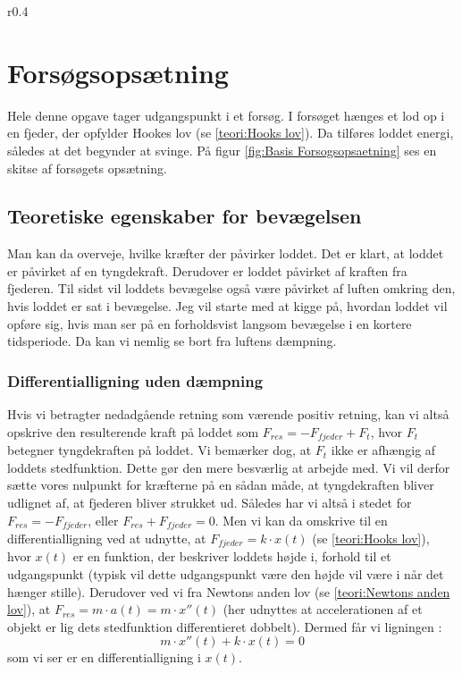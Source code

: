 \begin{wrapfigure}{r}{0.4\textwidth}
\centering
{}%

\caption{Skitse af forsøgsopsætning.}
\label{fig:Basis Forsogsopsaetning}
\end{wrapfigure} 


\section{Forsøgsopsætning}\label{teori: opsatning af differentialligninger}
Hele denne opgave tager udgangspunkt i et forsøg.
I forsøget hænges et lod op i en fjeder, der opfylder Hookes lov (se \ref{teori:Hooks lov}). 
Da tilføres loddet energi, således at det begynder at svinge. 
På figur \ref{fig:Basis Forsogsopsaetning} ses en skitse af forsøgets opsætning.



\subsection{Teoretiske egenskaber for bevægelsen}
Man kan da overveje, hvilke kræfter der påvirker loddet. 
Det er klart, at loddet er påvirket af en tyngdekraft. 
Derudover er loddet påvirket af kraften fra fjederen.
Til sidst vil loddets bevægelse også være påvirket af luften omkring den, hvis loddet er sat i bevægelse. 
Jeg vil starte med at kigge på, hvordan loddet vil opføre sig, hvis man ser på en forholdsvist langsom bevægelse i en kortere tidsperiode.
Da kan vi nemlig se bort fra luftens dæmpning. 

\subsubsection{Differentialligning uden dæmpning}\label{teori: Opstilling ligning uden dampning}
Hvis vi betragter nedadgående retning som værende positiv retning, kan vi altså opskrive den resulterende kraft på loddet som $F_{res} = -F_{fjeder}+F_{t}$, hvor $F_t$ betegner tyngdekraften på loddet. 
Vi bemærker dog, at $F_t$ ikke er afhængig af loddets stedfunktion. 
Dette gør den mere besværlig at arbejde med. 
Vi vil derfor sætte vores nulpunkt for kræfterne på en sådan måde, at tyngdekraften bliver udlignet af, at fjederen bliver strukket ud. 
Således har vi altså i stedet for $F_{res}=-F_{fjeder}$, eller $F_{res}+F_{fjeder}=0$.
Men vi kan da omskrive til en differentialligning ved at udnytte, at $F_{fjeder}=k \cdot x(t)$ (se \ref{teori:Hooks lov}), hvor $x(t)$ er en funktion, der beskriver loddets højde i, forhold til et udgangspunkt (typisk vil dette udgangspunkt være den højde vil være i når det hænger stille).  
Derudover ved vi fra Newtons anden lov (se \ref{teori:Newtons anden lov}), at $F_{res}=m\cdot a(t) = m \cdot x''(t)$ 
(her udnyttes at accelerationen af et objekt er lig dets stedfunktion differentieret dobbelt). 
Dermed får vi ligningen :
$$m\cdot x''(t)+k\cdot x(t)=0$$ 
som vi ser er en differentialligning i $x(t)$.

